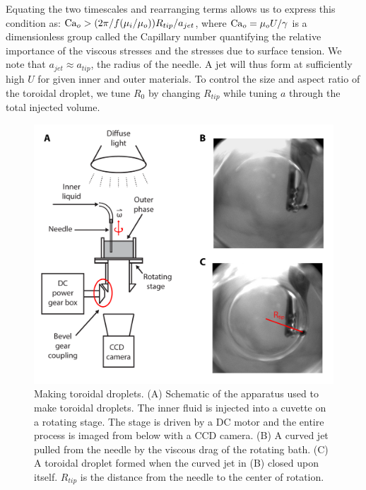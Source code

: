 Equating the two timescales and rearranging terms allows us to express this condition as: $\textup{Ca}_o > (2 \pi / f(\mu_i/\mu_o))R_{tip}/a_{jet}$, where $\textup{Ca}_o = \mu_o U/\gamma$ is a dimensionless group called the Capillary number quantifying the relative importance of the viscous stresses and the stresses due to surface tension.
We note that $a_{jet} \approx a_{tip}$, the radius of the needle.
A jet will thus form at sufficiently high $U$ for given inner and outer materials.
To control the size and aspect ratio of the toroidal droplet, we tune $R_0$ by changing $R_{tip}$ while tuning $a$ through the total injected volume.
\begin{figure}
  \centering
  \includegraphics{figures/C3/Ch3-Figs_MakeTorus.png}
  \caption{Making toroidal droplets.
  (A) Schematic of the apparatus used to make toroidal droplets.
  The inner fluid is injected into a cuvette on a rotating stage.
  The stage is driven by a DC motor and the entire process is imaged from below with a CCD camera.
  (B) A curved jet pulled from the needle by the viscous drag of the rotating bath.
  (C) A toroidal droplet formed when the curved jet in (B) closed upon itself.
  $R_{tip}$ is the distance from the needle to the center of rotation.}\label{f:3-MakeTorus}
\end{figure}

